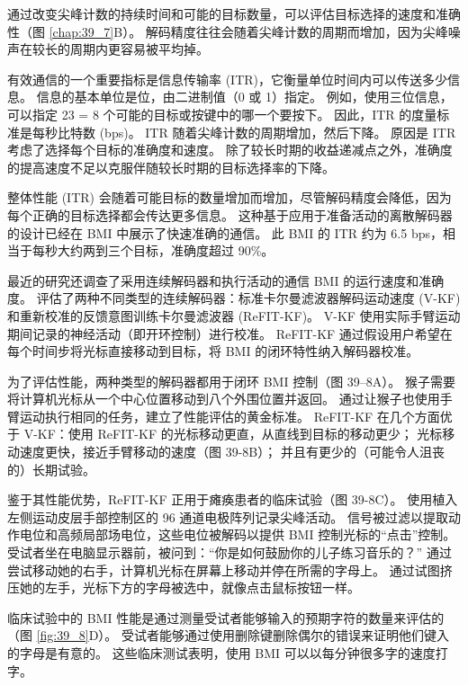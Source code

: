 通过改变尖峰计数的持续时间和可能的目标数量，可以评估目标选择的速度和准确性（图 \ref{chap:39_7}B）。
解码精度往往会随着尖峰计数的周期而增加，因为尖峰噪声在较长的周期内更容易被平均掉。


有效通信的一个重要指标是信息传输率 (ITR)，它衡量单位时间内可以传送多少信息。 
信息的基本单位是位，由二进制值（0 或 1）指定。 
例如，使用三位信息，可以指定 23 = 8 个可能的目标或按键中的哪一个要按下。 
因此，ITR 的度量标准是每秒比特数 (bps)。 
ITR 随着尖峰计数的周期增加，然后下降。 
原因是 ITR 考虑了选择每个目标的准确度和速度。 
除了较长时期的收益递减点之外，准确度的提高速度不足以克服伴随较长时期的目标选择率的下降。


整体性能 (ITR) 会随着可能目标的数量增加而增加，尽管解码精度会降低，因为每个正确的目标选择都会传达更多信息。
这种基于应用于准备活动的离散解码器的设计已经在 BMI 中展示了快速准确的通信。
此 BMI 的 ITR 约为 6.5 bps，相当于每秒大约两到三个目标，准确度超过 90\%。


最近的研究还调查了采用连续解码器和执行活动的通信 BMI 的运行速度和准确度。
评估了两种不同类型的连续解码器：标准卡尔曼滤波器解码运动速度 (V-KF) 和重新校准的反馈意图训练卡尔曼滤波器 (ReFIT-KF)。
V-KF 使用实际手臂运动期间记录的神经活动（即开环控制）进行校准。
ReFIT-KF 通过假设用户希望在每个时间步将光标直接移动到目标，将 BMI 的闭环特性纳入解码器校准。


为了评估性能，两种类型的解码器都用于闭环 BMI 控制（图 39–8A）。
猴子需要将计算机光标从一个中心位置移动到八个外围位置并返回。
通过让猴子也使用手臂运动执行相同的任务，建立了性能评估的黄金标准。
ReFIT-KF 在几个方面优于 V-KF：使用 ReFIT-KF 的光标移动更直，从直线到目标的移动更少； 光标移动速度更快，接近手臂移动的速度（图 39-8B）； 并且有更少的（可能令人沮丧的）长期试验。


鉴于其性能优势，ReFIT-KF 正用于瘫痪患者的临床试验（图 39-8C）。
使用植入左侧运动皮层手部控制区的 96 通道电极阵列记录尖峰活动。
信号被过滤以提取动作电位和高频局部场电位，这些电位被解码以提供 BMI 控制光标的“点击”控制。
受试者坐在电脑显示器前，被问到：“你是如何鼓励你的儿子练习音乐的？” 通过尝试移动她的右手，计算机光标在屏幕上移动并停在所需的字母上。
通过试图挤压她的左手，光标下方的字母被选中，就像点击鼠标按钮一样。


临床试验中的 BMI 性能是通过测量受试者能够输入的预期字符的数量来评估的（图 \ref{fig:39_8}D）。
受试者能够通过使用删除键删除偶尔的错误来证明他们键入的字母是有意的。
这些临床测试表明，使用 BMI 可以以每分钟很多字的速度打字。


